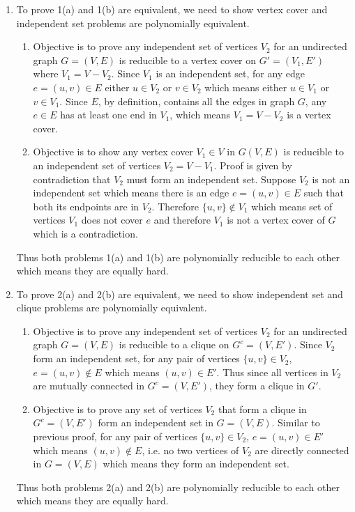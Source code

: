 \begin{enumerate}
  \item To prove 1(a) and 1(b) are equivalent, we need to show vertex cover and independent set problems are polynomially equivalent.
  \begin{enumerate}
    \item Objective is to prove any independent set of vertices $V_2$ for an undirected graph $G = (V, E)$ is reducible to a vertex cover on $G' = (V_1, E')$ where $V_1 = V - V_2$.
    Since $V_1$ is an independent set, for any edge $e = (u,v) \in E$ either $u\in V_2$ or $v\in V_2$ which means either $u \in V_1$ or $v \in V_1$. Since $E$, by definition, contains all the edges in graph $G$, any $e \in E$ has at least one end in $V_1$, which means $V_1 = V - V_2$ is a vertex cover.
    \item Objective is to show any vertex cover $V_1 \in V$ in $G(V, E)$ is reducible to an independent set of vertices $V_2 = V - V_1$. Proof is given by contradiction that $V_2$ must form an independent set. Suppose $V_2$ is not an independent set which means there is an edge $e = (u,v) \in E$ such that both its endpoints are in $V_2$. Therefore $\{u, v\} \notin V_1$ which means set of vertices $V_1$ does not cover $e$ and therefore $V_1$ is not a vertex cover of $G$ which is a contradiction.
  \end{enumerate}
  Thus both problems 1(a) and 1(b) are polynomially reducible to each other which means they are equally hard.
  \item To prove 2(a) and 2(b) are equivalent, we need to show independent set and clique problems are polynomially equivalent.
  \begin{enumerate}
    \item Objective is to prove any independent set of vertices $V_2$ for an undirected graph $G = (V, E)$ is reducible to a clique on $G^c = (V, E')$. Since $V_2$ form an independent set, for any pair of vertices $\{u, v\} \in V_2$, $e = (u, v) \notin E$ which means $(u, v) \in E'$. Thus since all vertices in $V_2$ are mutually connected in $G^c = (V, E')$, they form a clique in $G'$.
    \item Objective is to prove any set of vertices $V_2$ that form a clique in $G^c=(V, E')$ form an independent set in $G = (V, E)$. Similar to previous proof, for any pair of vertices $\{u, v\}\in V_2$, $e = (u, v) \in E'$ which means $(u,v) \notin E$, i.e. no two vertices of $V_2$ are directly connected in $G=(V,E)$ which means they form an independent set.  
  \end{enumerate}
  Thus both problems 2(a) and 2(b) are polynomially reducible to each other which means they are equally hard.
\end{enumerate}
